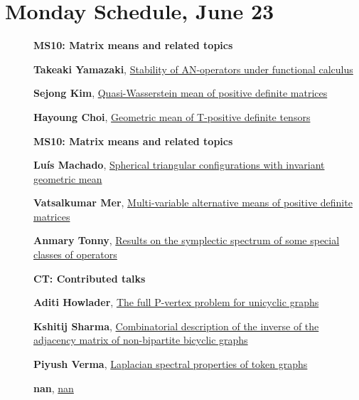 \documentclass[ILAS2025-program.tex]{subfiles}
\begin{document}
\section*{Monday Schedule, June 23 }
        
        \begin{description}
    \item[] {\color{mstitle}\textbf{MS10: Matrix means and related topics}} 
    \item[] \hypertarget{up0022}{}\textbf{Takeaki Yamazaki}, \hyperlink{down0022}{Stability of AN-operators under functional calculus}
        \item[] \hypertarget{up0023}{}\textbf{Sejong Kim}, \hyperlink{down0023}{Quasi-Wasserstein mean of positive definite matrices}
        \item[] \hypertarget{up0024}{}\textbf{Hayoung Choi}, \hyperlink{down0024}{Geometric mean of T-positive definite tensors}
        \end{description}
    \begin{description}
    \item[] {\color{mstitle}\textbf{MS10: Matrix means and related topics}} 
    \item[] \hypertarget{up0055}{}\textbf{Luís Machado}, \hyperlink{down0055}{Spherical triangular configurations with invariant geometric mean}
        \item[] \hypertarget{up0056}{}\textbf{Vatsalkumar Mer}, \hyperlink{down0056}{Multi-variable alternative means of positive definite matrices}
        \item[] \hypertarget{up0057}{}\textbf{Anmary Tonny}, \hyperlink{down0057}{Results on the symplectic spectrum of some special classes of operators}
        \end{description}
    \begin{description}
    \item[] {\color{mstitle}\textbf{CT: Contributed talks}} 
    \item[] \hypertarget{up0092}{}\textbf{Aditi Howlader}, \hyperlink{down0092}{The full P-vertex problem for unicyclic graphs}
        \item[] \hypertarget{up0093}{}\textbf{Kshitij Sharma}, \hyperlink{down0093}{Combinatorial description of the inverse of the adjacency matrix of non-bipartite bicyclic graphs}
        \item[] \hypertarget{up0094}{}\textbf{Piyush Verma}, \hyperlink{down0094}{Laplacian spectral properties of token graphs}
        \item[] \hypertarget{up0095}{}\textbf{nan}, \hyperlink{down0095}{nan}
        \end{description}
    \newpage
\end{document}
